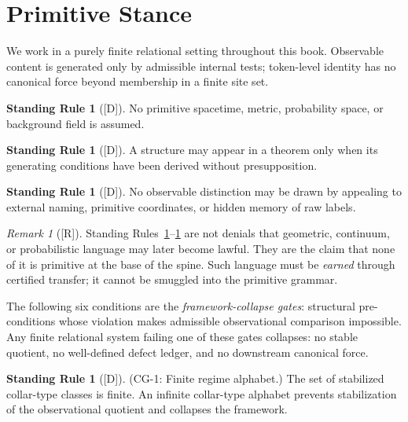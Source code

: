 \documentclass[12pt,oneside]{amsbook}
\theoremstyle{plain}
\theoremstyle{definition}
\newtheorem{standingrule}[theorem]{Standing Rule}
\theoremstyle{remark}
\newtheorem{remark}[theorem]{Remark}
\newcommand{\status}[1]{\textup{[#1]}}
\begin{document}
\section{Primitive Stance}

We work in a purely finite relational setting throughout this book.
Observable content is generated only by admissible internal tests;
token-level identity has no canonical force beyond membership in a
finite site set.

\begin{standingrule}[\status{D}]\label{sr:no-primitive}
No primitive spacetime, metric, probability space, or background field
is assumed.
\end{standingrule}

\begin{standingrule}[\status{D}]\label{sr:licensing}
A structure may appear in a theorem only when its generating conditions
have been derived without presupposition.
\end{standingrule}

\begin{standingrule}[\status{D}]\label{sr:no-smuggling}
No observable distinction may be drawn by appealing to external naming,
primitive coordinates, or hidden memory of raw labels.
\end{standingrule}

\begin{remark}[\status{R}]
Standing Rules~\ref{sr:no-primitive}--\ref{sr:no-smuggling} are not
denials that geometric, continuum, or probabilistic language may later
become lawful.  They are the claim that none of it is primitive at the
base of the spine.  Such language must be \emph{earned} through
certified transfer; it cannot be smuggled into the primitive grammar.
\end{remark}


The following six conditions are the \emph{framework-collapse gates}:
structural pre-conditions whose violation makes admissible
observational comparison impossible.  Any finite relational system
failing one of these gates collapses: no stable quotient, no
well-defined defect ledger, and no downstream canonical force.

\begin{standingrule}[\status{D}]\label{sr:cg-alphabet}
\textup{(CG-1: Finite regime alphabet.)}
The set of stabilized collar-type classes is finite.  An infinite
collar-type alphabet prevents stabilization of the observational
quotient and collapses the framework.
\end{standingrule}
\end{document}

